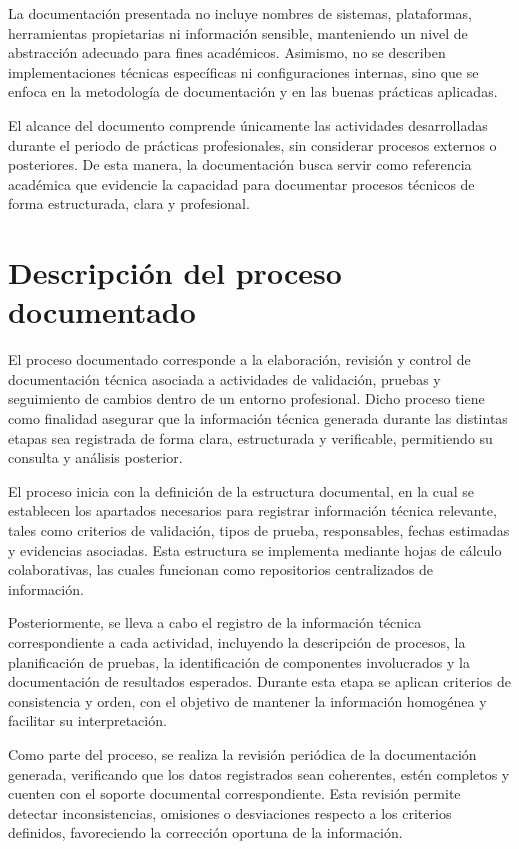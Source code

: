 \documentclass[12pt]{article}
\begin{document}
La documentación presentada no incluye nombres de sistemas, plataformas, herramientas propietarias ni información sensible, manteniendo un nivel de abstracción adecuado para fines académicos. Asimismo, no se describen implementaciones técnicas específicas ni configuraciones internas, sino que se enfoca en la metodología de documentación y en las buenas prácticas aplicadas.

El alcance del documento comprende únicamente las actividades desarrolladas durante el periodo de prácticas profesionales, sin considerar procesos externos o posteriores. De esta manera, la documentación busca servir como referencia académica que evidencie la capacidad para documentar procesos técnicos de forma estructurada, clara y profesional.


\section*{Descripción del proceso documentado}

El proceso documentado corresponde a la elaboración, revisión y control de documentación técnica asociada a actividades de validación, pruebas y seguimiento de cambios dentro de un entorno profesional. Dicho proceso tiene como finalidad asegurar que la información técnica generada durante las distintas etapas sea registrada de forma clara, estructurada y verificable, permitiendo su consulta y análisis posterior.

El proceso inicia con la definición de la estructura documental, en la cual se establecen los apartados necesarios para registrar información técnica relevante, tales como criterios de validación, tipos de prueba, responsables, fechas estimadas y evidencias asociadas. Esta estructura se implementa mediante hojas de cálculo colaborativas, las cuales funcionan como repositorios centralizados de información.

Posteriormente, se lleva a cabo el registro de la información técnica correspondiente a cada actividad, incluyendo la descripción de procesos, la planificación de pruebas, la identificación de componentes involucrados y la documentación de resultados esperados. Durante esta etapa se aplican criterios de consistencia y orden, con el objetivo de mantener la información homogénea y facilitar su interpretación.

Como parte del proceso, se realiza la revisión periódica de la documentación generada, verificando que los datos registrados sean coherentes, estén completos y cuenten con el soporte documental correspondiente. Esta revisión permite detectar inconsistencias, omisiones o desviaciones respecto a los criterios definidos, favoreciendo la corrección oportuna de la información.
\end{document}
